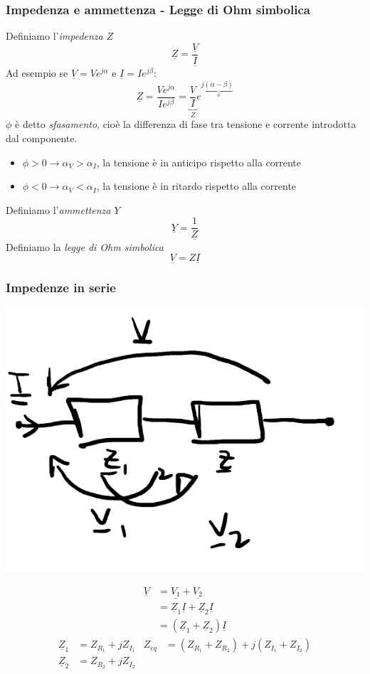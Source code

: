 \documentclass{article}
\begin{document}
\subsubsection{Impedenza e ammettenza - Legge di Ohm simbolica}
Definiamo l'\textit{impedenza} $Z$
\[
    \underline{Z} = \frac{\underline{V}}{\underline{I}}
\]
Ad esempio se $\underline{V}=Ve^{j \alpha}$ e $\underline{I} = Ie^{j \beta}$:
\[
    \underline{Z} = \frac{Ve^{j \alpha}}{Ie^{j \beta}} = \underbrace{\frac{V}{I}}_{Z}e^{j\underbrace{(\alpha - \beta)}_{\phi}}
\]
$\phi$ è detto \textit{sfasamento}, cioè la differenza di fase tra tensione e corrente introdotta dal componente.
\begin{itemize}
    \item $\phi >0 \rightarrow \alpha_V > \alpha_I$, la tensione è in anticipo rispetto alla corrente
    \item $\phi <0 \rightarrow \alpha_V < \alpha_I$, la tensione è in ritardo rispetto alla corrente
\end{itemize}


Definiamo l'\textit{ammettenza} $Y$
\[
    \underline{Y} = \frac{1}{\underline{Z}}
\]
Definiamo la \textit{legge di Ohm simbolica}
\[
    \underline{V} = Z\underline{I}
\]

\subsubsection*{Impedenze in serie}
\begin{center}
    \includegraphics[scale=0.3]{Image/Impedenza_serie.png}
\end{center}
\begin{align*}
    \underline{V} &= \underline{V_1}+\underline{V_2}\\
    &= \underline{Z}_1 \underline{I} + \underline{Z}_2 \underline{I}\\
    &= \left(\underline{Z}_1+ \underline{Z}_2\right)\underline{I}
\end{align*}
\begin{align*}
    \underline{Z}_1 &= Z_{R_1} + j Z_{I_1} & Z_{eq} &= \left(Z_{R_1}+Z_{R_2}\right) + j \left(Z_{I_1}+Z_{I_2}\right)\\
    \underline{Z}_2 &= Z_{R_2} + j Z_{I_2}
\end{align*}
\end{document}
